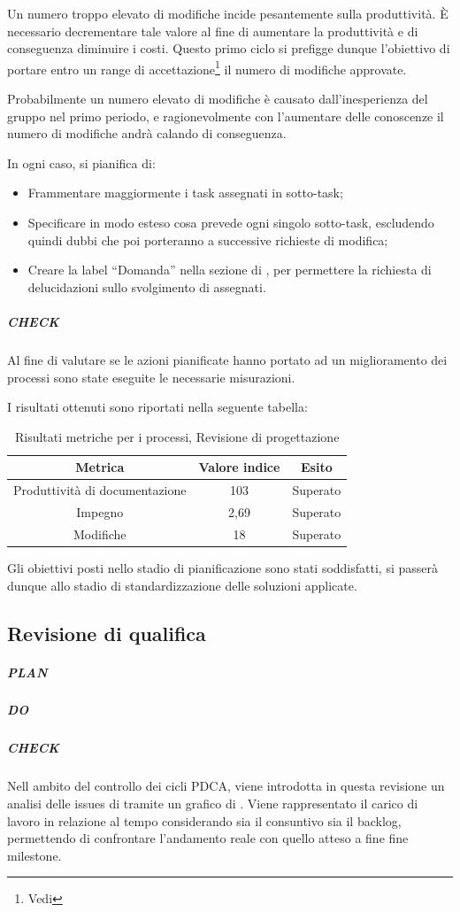 Un numero troppo elevato di modifiche incide pesantemente sulla produttività. È necessario decrementare tale valore al fine di aumentare la produttività e di conseguenza diminuire i costi. Questo primo ciclo  si prefigge dunque l'obiettivo di portare entro un range di accettazione\footnote{Vedi \PianoDiQualifica} il numero di modifiche approvate.

Probabilmente un numero elevato di modifiche è causato dall'inesperienza del gruppo nel primo periodo, e ragionevolmente con l'aumentare delle conoscenze il numero di modifiche andrà calando di conseguenza. 

In ogni caso, si pianifica di:
\begin{itemize}
\item Frammentare maggiormente i task assegnati in sotto-task;
\item Specificare in modo esteso cosa prevede ogni singolo sotto-task, escludendo quindi dubbi che poi porteranno a successive richieste di modifica;
\item Creare la label ``Domanda'' nella sezione  di , per permettere la richiesta di delucidazioni sullo svolgimento di  assegnati.
\end{itemize}
  
\subparagraph{CHECK}

Al fine di valutare se le azioni pianificate hanno portato ad un miglioramento dei processi sono state eseguite le necessarie misurazioni.

I risultati ottenuti sono riportati nella seguente tabella:
\begin{table}[H]
\centering
\begin{tabular}{ | c | c | c | }
\hline
\textbf{Metrica} & \textbf{Valore indice} & \textbf{Esito} \\
\hline
Produttività di documentazione & 103 & Superato \\
\hline
Impegno & 2,69 & Superato \\
\hline
Modifiche & 18 & Superato \\
\hline
\end{tabular}
\caption{Risultati metriche per i processi, Revisione di progettazione}
\end{table}

Gli obiettivi posti nello stadio di pianificazione sono stati soddisfatti, si passerà dunque allo stadio di standardizzazione delle soluzioni applicate. 


\subsection{Revisione di qualifica}
	\subparagraph{PLAN}
	\subparagraph{DO}
	\subparagraph{CHECK}
	Nell ambito del controllo dei cicli PDCA, viene introdotta in questa revisione un analisi delle issues di  tramite un grafico di . Viene rappresentato il carico di lavoro in relazione al tempo considerando sia il consuntivo sia il backlog, permettendo di confrontare l'andamento reale con quello atteso a fine fine milestone.
	
